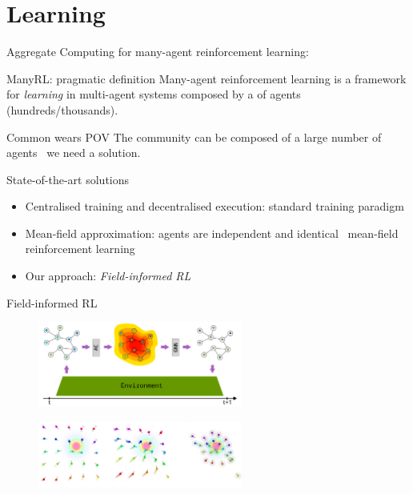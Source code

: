 \documentclass[presentation, 9pt, aspectratio=169]{beamer}\mode<presentation>{\usetheme{AMSBolognaFC}}
\begin{document}
\section{Learning}
\begin{frame}{Aggregate Computing for many-agent reinforcement learning: }
	\begin{alertblock}{ManyRL: pragmatic definition}
		Many-agent reinforcement learning is a framework for \emph{learning} in multi-agent systems composed by a  of agents (hundreds/thousands).
		
	\end{alertblock}
	\begin{exampleblock}{Common wears POV}	
		The community can be composed of a large number of agents \faArrowRight \, we need a  solution.
	\end{exampleblock}
	\begin{exampleblock}{State-of-the-art solutions}
		\begin{itemize}
			\item Centralised training and decentralised execution: standard training paradigm
			\item Mean-field approximation: agents are independent and identical \faArrowRight \, mean-field reinforcement learning
			\item Our approach: \emph{Field-informed RL}
		\end{itemize}
	\end{exampleblock}
\end{frame}
\begin{frame}{Field-informed RL}
	\begin{figure}
		\centering
		\includegraphics[width=0.6\textwidth]{img/field-informed-structure}
	\end{figure}
	\begin{figure}
		\centering
		\includegraphics[width=0.6\textwidth]{img/field-informed}
	\end{figure}
\end{frame}
\end{document}
